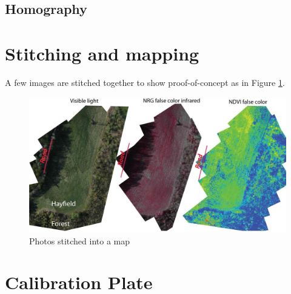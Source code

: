 
\subsection{Homography}



\section{Stitching and mapping}

A few images are stitched together to show proof-of-concept as in Figure \ref{fig:stitch_map}.

\begin{figure}[H]
\centering
\includegraphics[scale=0.35]{images/ndvi_stitch_example.jpg}
\caption{Photos stitched into a map}
\label{fig:stitch_map}
\end{figure}

\section{Calibration Plate}
\label{sec:cal_plate}

